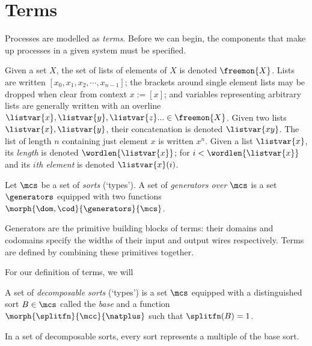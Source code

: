 \section{Terms}

Processes are modelled as \emph{terms}.
Before we can begin, the components that make up processes in a given system
must be specified.

\begin{notation}[Lists]
    Given a set \(X\), the set of lists of elements of \(X\) is denoted
    \(\freemon{X}\).
    Lists are written \([x_0, x_1, x_2, \cdots, x_{n-1}]\); the brackets around
    single element lists may be dropped when clear from context \(x := [x]\);
    and variables representing arbitrary lists are generally written with an
    overline \(
        \listvar{x}, \listvar{y}, \listvar{z}... \in \freemon{X}
    \).
    Given two lists \(\listvar{x}, \listvar{y}\), their concatenation is
    denoted \(\listvar{xy}\).
    The list of length \(n\) containing just element \(x\) is written \(x^n\).
    Given a list \(\listvar{x}\), its \emph{length} is denoted
    \(\wordlen{\listvar{x}}\); for \(i < \wordlen{\listvar{x}}\) and its
    \(i\)\emph{th element} is denoted \(\listvar{x}(i)\).
\end{notation}

\begin{definition}[Generators]
    Let \(\mcs\) be a set of \emph{sorts} (`types').
    A set of \emph{generators over} \(\mcs\) is a set \(\generators\)
    equipped with two functions \(\morph{\dom,\cod}{\generators}{\mcs}\).
\end{definition}

Generators are the primitive building blocks of terms: their domains and
codomains specify the widths of their input and output wires respectively.
Terms are defined by combining these primitives together.

For our definition of terms, we will

\begin{definition}
    A set of \emph{decomposable sorts} (`types') is a set \(\mcs\) equipped with
    a distinguished sort \(B \in \mcs\) called the \emph{base} and a function \(
        \morph{\splitfn}{\mcc}{\natplus}
    \) such that \(\splitfn(B) = 1\).
\end{definition}

In a set of decomposable sorts, every sort represents a multiple of the base
sort.

